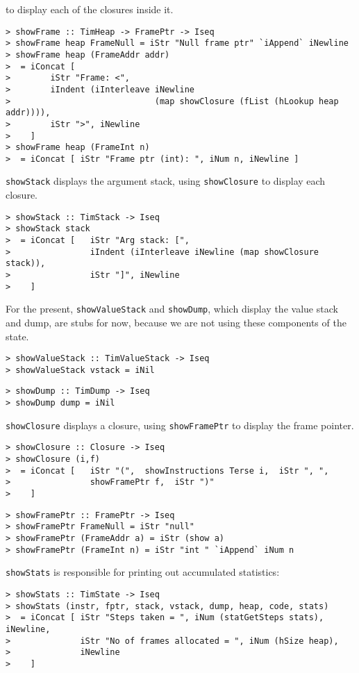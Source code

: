 to display each of the closures inside it.
\begin{verbatim}
> showFrame :: TimHeap -> FramePtr -> Iseq
> showFrame heap FrameNull = iStr "Null frame ptr" `iAppend` iNewline
> showFrame heap (FrameAddr addr)
>  = iConcat [
>        iStr "Frame: <",
>        iIndent (iInterleave iNewline
>                             (map showClosure (fList (hLookup heap addr)))),
>        iStr ">", iNewline
>    ]
> showFrame heap (FrameInt n)
>  = iConcat [ iStr "Frame ptr (int): ", iNum n, iNewline ]
\end{verbatim}
%
%
%
%
\mbox{\tt showStack} displays the argument stack, using \mbox{\tt showClosure} to display each
closure.
\begin{verbatim}
> showStack :: TimStack -> Iseq
> showStack stack
>  = iConcat [   iStr "Arg stack: [",
>                iIndent (iInterleave iNewline (map showClosure stack)),
>                iStr "]", iNewline
>    ]
\end{verbatim}
%
%
\par
For the present, \mbox{\tt showValueStack} and \mbox{\tt showDump}, which display the value
stack and dump, are stubs for now, because we are not using these components
of the state.
\begin{verbatim}
> showValueStack :: TimValueStack -> Iseq
> showValueStack vstack = iNil
\end{verbatim}
%
%
\begin{verbatim}
> showDump :: TimDump -> Iseq
> showDump dump = iNil
\end{verbatim}
%
%
\mbox{\tt showClosure} displays a closure, using \mbox{\tt showFramePtr} to display
the frame pointer.
\begin{verbatim}
> showClosure :: Closure -> Iseq
> showClosure (i,f)
>  = iConcat [   iStr "(",  showInstructions Terse i,  iStr ", ",
>                showFramePtr f,  iStr ")"
>    ]
\end{verbatim}
%
%
\begin{verbatim}
> showFramePtr :: FramePtr -> Iseq
> showFramePtr FrameNull = iStr "null"
> showFramePtr (FrameAddr a) = iStr (show a)
> showFramePtr (FrameInt n) = iStr "int " `iAppend` iNum n
\end{verbatim}
%
%
%
%
\mbox{\tt showStats} is responsible for printing out accumulated statistics:
\begin{verbatim}
> showStats :: TimState -> Iseq
> showStats (instr, fptr, stack, vstack, dump, heap, code, stats)
>  = iConcat [ iStr "Steps taken = ", iNum (statGetSteps stats), iNewline,
>              iStr "No of frames allocated = ", iNum (hSize heap),
>              iNewline
>    ]
\end{verbatim}
%
%
